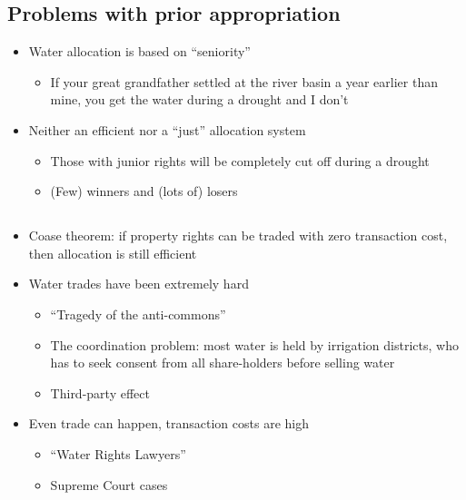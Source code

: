 \documentclass[]{article}
\providecommand{\tightlist}{%
  \setlength{\itemsep}{0pt}\setlength{\parskip}{0pt}}
\begin{document}
\hypertarget{problems-with-prior-appropriation}{%
\subsection{Problems with prior
appropriation}\label{problems-with-prior-appropriation}}

\begin{itemize}
\tightlist
\item
  Water allocation is based on ``seniority''

  \begin{itemize}
  \tightlist
  \item
    If your great grandfather settled at the river basin a year earlier
    than mine, you get the water during a drought and I don't
  \end{itemize}
\item
  Neither an efficient nor a ``just'' allocation system

  \begin{itemize}
  \tightlist
  \item
    Those with junior rights will be completely cut off during a drought
  \item
    (Few) winners and (lots of) losers
  \end{itemize}
\end{itemize}

\hypertarget{section-35}{%
\subsection{}\label{section-35}}

\begin{itemize}
\tightlist
\item
  Coase theorem: if property rights can be traded with zero transaction
  cost, then allocation is still efficient
\item
  Water trades have been extremely hard

  \begin{itemize}
  \tightlist
  \item
    ``Tragedy of the anti-commons''
  \item
    The coordination problem: most water is held by irrigation
    districts, who has to seek consent from all share-holders before
    selling water
  \item
    Third-party effect
  \end{itemize}
\item
  Even trade can happen, transaction costs are high

  \begin{itemize}
  \tightlist
  \item
    ``Water Rights Lawyers''
  \item
    Supreme Court cases
  \end{itemize}
\end{itemize}
\end{document}
